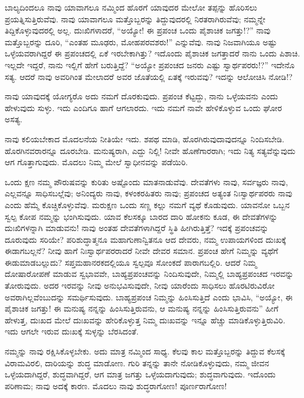 ಬಾಲ್ಯದಿಂದಲೂ ನಾವು ಯಾವಾಗಲೂ ನಮ್ಮಿಂದ ಹೊರಗೆ ಯಾವುದರ ಮೇಲೋ ತಪ್ಪನ್ನು ಹೊರಿಸಲು ಪ್ರಯತ್ನಿಸುತ್ತಿರುವೆವು. ನಾವು ಯಾವಾಗಲೂ ಮತ್ತೊಬ್ಬರನ್ನು ತಿದ್ದುವುದರಲ್ಲಿ ನಿರತರಾಗಿರುವೆವು; ನಮ್ಮನ್ನೇ ತಿದ್ದಿಕೊಳ್ಳುವುದರಲ್ಲಿ ಅಲ್ಲ. ದುಃಖಿಗಳಾದರೆ, “ಅಯ್ಯೋ! ಈ ಪ್ರಪಂಚ ಒಂದು ಪೈಶಾಚಿಕ ಜಗತ್ತು!?” ನಾವು ಮತ್ತೊಬ್ಬರನ್ನು ದೂರಿ, “ಎಂತಹ ಮೂಢರು, ಮೋಹಪರವಶರು!'' ಎನ್ನುವೆವು. ನಾವು ನಿಜವಾಗಿಯೂ ಅಷ್ಟು ಒಳ್ಳೆಯವರಾಗಿದ್ದರೆ ಈ ಪ್ರಪಂಚದಲ್ಲಿ ಏಕೆ ಇರಬೇಕಾಗಿತ್ತು? ಇದೊಂದು ಪೈಶಾಚಿಕ ಜಗತ್ತಾದರೆ ನಾನು ಒಂದು ಪಿಶಾಚಿ. ಇಲ್ಲದೇ ಇದ್ದರೆ, ನಾನು ಇಲ್ಲಿಗೆ ಹೇಗೆ ಬರುತ್ತಿದ್ದೆ? “ಅಯ್ಯೋ ಪ್ರಪಂಚದ ಜನರು ಎಷ್ಟು ಸ್ವಾರ್ಥಪರರು!?” ಇದೇನೊ ಸತ್ಯ. ಆದರೆ ನಾವು ಅವರಿಗಿಂತ ಮೇಲಾದರೆ ಅವರ ಜೊತೆಯಲ್ಲಿ ಏತಕ್ಕೆ ಇರುವವು? ಇದನ್ನು ಆಲೋಚಿಸಿ ನೋಡಿ!?

\newpage

ನಾವು ಯಾವುದಕ್ಕೆ ಯೋಗ್ಯರೊ ಅದು ನಮಗೆ ದೊರಕುವುದು. ಪ್ರಪಂಚ ಕೆಟ್ಟದ್ದು, ನಾನು ಒಳ್ಳೆಯವನು ಎಂದು ಹೇಳುವುದು ಸುಳ್ಳು. ಇದು ಎಂದಿಗೂ ಹಾಗೆ ಆಗಲಾರದು. ಇದು ನಮಗೆ ನಾವೇ ಹೇಳಿಕೊಳ್ಳುವ ಒಂದು ಘೋರ ಅಸತ್ಯ.

ನಾವು ಕಲಿಯಬೇಕಾದ ಮೊದಲನೆಯ ನೀತಿಯೇ ಇದು. ಶಪಥ ಮಾಡಿ, ಹೊರಗಿರುವುದಾವುದನ್ನೂ ನಿಂದಿಸಬೇಡಿ. ಹೊರಗಿನವರಾರನ್ನೂ ದೂರಬೇಡಿ. ಮನುಷ್ಯರಾಗಿ, ಎದ್ದು ನಿಲ್ಲಿ! ನೀವೇ ಹೊಣೆಗಾರರಾಗಿ; ಇದು ನಿತ್ಯ ಸತ್ಯವೆನ್ನುವುದು ಆಗ ಗೊತ್ತಾಗುವುದು. ಮೊದಲು ನಿಮ್ಮ ಮೇಲೆ ಸ್ವಾಧೀನವನ್ನು ಪಡೆಯಿರಿ.

ಒಂದು ಕ್ಷಣ ನಮ್ಮ ಪೌರುಷವನ್ನು ಕುರಿತು ಅಷ್ಟೊಂದು ಮಾತನಾಡುವೆವು. ದೇವತೆಗಳು ನಾವು, ಸರ್ವಜ್ಞರು ನಾವು, ಎಲ್ಲವನ್ನೂ ಸಾಧಿಸಬಲ್ಲೆವು; ಅನಿಂದ್ಯರು ನಾವು, ಕಳಂಕರಹಿತರು ನಾವು; ಪ್ರಪಂಚದ ಅತ್ಯಂತ ನಿಃಸ್ವಾರ್ಥಪರರು ನಾವು ಎಂದು ಹೆಮ್ಮೆ ಕೊಚ್ಚಿಕೊಳ್ಳುವೆವು. ಮರುಕ್ಷಣ ಒಂದು ಸಣ್ಣ ಕಲ್ಲು ನಮಗೆ ವ್ಯಥೆ ಕೊಡುವುದು. ಯಾವನೋ ಒಬ್ಬನ ಸ್ವಲ್ಪ ಕೋಪ ನಮ್ಮನ್ನು ಭಂಗಿಸುವುದು. ಯಾವ ಕೆಲಸಕ್ಕೂ ಬಾರದ ದಾರಿ ಹೋಕನು ಕೂಡ, ಈ ದೇವತೆಗಳನ್ನು ದುಃಖಿಗಳನ್ನಾಗಿ ಮಾಡುವನು! ನಾವು ಅಂತಹ ದೇವತೆಗಳಾಗಿದ್ದರೆ ಸ್ಥಿತಿ ಹೀಗಿರುತ್ತಿತ್ತೆ? ಇದಕ್ಕೆ ಪ್ರಪಂಚವನ್ನು ದೂರುವುದು ಸರಿಯೇ? ಪರಿಶುದ್ಧಾತ್ಮನೂ ಮಹಾಗುಣಾನ್ವಿತನೂ ಆದ ದೇವರು, ನಮ್ಮ ಉಪಾಯಗಳಿಂದ ದುಃಖಕ್ಕೆ ಈಡಾಗಬಲ್ಲನೆ? ನೀವು ಹಾಗೆ ನಿಃಸ್ವಾರ್ಥಪರರಾದರೆ ನೀವೇ ದೇವರ ಸಮಾನ. ಪ್ರಪಂಚ ಹೇಗೆ ನಿಮ್ಮನ್ನು ವ್ಯಥೆಗೆ ಈಡುಮಾಡಬಲ್ಲುದು? ಸಪ್ತಮಹಾನರಕದಲ್ಲಿಯೂ ಸ್ವಲ್ಪವೂ ಸೋಂಕದೆ ಪಾರಾಗಬಲ್ಲಿರಿ. ಆದರೆ ನಿಮ್ಮ ದೋಷಾರೋಪಣೆ ಮಾಡುವ ಸ್ವಭಾವವೇ, ಬಾಹ್ಯಪ್ರಪಂಚವನ್ನು ನಿಂದಿಸುವುದೇ, ನಿಮ್ಮಲ್ಲಿ ಬಾಹ್ಯಪ್ರಪಂಚದ ಇರವನ್ನು ತೋರುವುದು. ಅದರ ಇರವನ್ನು ನೀವು ಅನುಭವಿಸುವುದೇ, ನೀವು ಯಾರೆಂದು ಸಾಧಿಸಲು ಹೊರಟಿರುವಿರೋ ಅವರಾಗಿಲ್ಲವೆಂಬುದನ್ನು ಸಮರ್ಥಿಸುವುದು. ಬಾಹ್ಯಪ್ರಪಂಚ ನಿಮ್ಮನ್ನು ಹಿಂಸಿಸುತ್ತಿದೆ ಎಂದು ಭಾವಿಸಿ, “ಅಯ್ಯೋ, ಈ ಪೈಶಾಚಿಕ ಜಗತ್ತು! ಈ ಮನುಷ್ಯ ನನ್ನನ್ನು ಹಿಂಸಿಸುತ್ತಿರುವನು, ಆ ಮನುಷ್ಯ ನನ್ನನ್ನು ಹಿಂಸಿಸುತ್ತಿರುವನು” ಹೀಗೆ ಹೇಳುತ್ತ, ದುಃಖದ ಮೇಲೆ ದುಃಖವನ್ನು ಹೇರಿಕೊಳ್ಳುತ್ತ ನಿಮ್ಮ ದುಃಖವನ್ನು ಇನ್ನೂ ಹೆಚ್ಚು ಮಾಡಿಕೊಳ್ಳುತ್ತಿರುವಿರಿ. ಇದು ಆಗಲೇ ಇರುವ ದುಃಖಕ್ಕೆ ಸುಳ್ಳನ್ನು ಬೆರಸಿದಂತೆ.

ನಮ್ಮನ್ನು ನಾವು ರಕ್ಷಿಸಿಕೊಳ್ಳಬೇಕು. ಅದು ಮಾತ್ರ ನಮ್ಮಿಂದ ಸಾಧ್ಯ. ಕೆಲವು ಕಾಲ ಮತ್ತೊಬ್ಬರನ್ನು ತಿದ್ದುವ ಕೆಲಸಕ್ಕೆ ವಿರಾಮವಿರಲಿ, ದಾರಿಯನ್ನು ಶುದ್ಧ ಮಾಡೋಣ. ಗುರಿ ತನ್ನನ್ನು ತಾನೇ ನೋಡಿಕೊಳ್ಳುವುದು, ನಮ್ಮ ಜೀವನ ಒಳ್ಳೆಯದಾಗಿದ್ದರೆ, ಶುದ್ಧವಾಗಿದ್ದರೆ, ಆಗ ಮಾತ್ರ ಜಗತ್ತು ಒಳ್ಳೆಯದಾಗುವುದು; ಶುದ್ಧವಾಗುವುದು. ಇದೊಂದು ಪರಿಣಾಮ; ನಾವು ಅದಕ್ಕೆ ಕಾರಣ. ಮೊದಲು ನಾವು ಶುದ್ಧರಾಗೋಣ! ಪೂರ್ಣರಾಗೋಣ!

